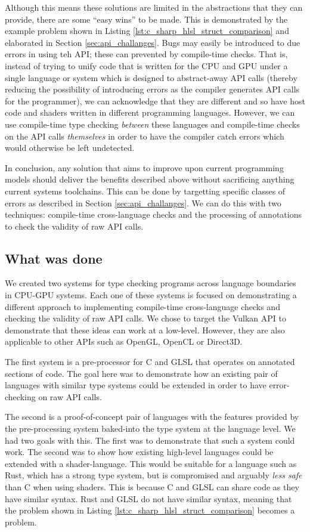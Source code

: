 \documentclass[a4paper,12pt,twoside,openright]{report}
\begin{document}
Although this means these solutions are limited in the abstractions that they
can provide, there are some ``easy wins'' to be made. This is demonstrated by
the example problem shown in Listing \ref{lst:c_sharp_hlsl_struct_comparison}
and elaborated in Section \ref{sec:api_challanges}. Bugs may easily be
introduced to due errors in using teh API; these can prevented by compile-time
checks. That is, instead of trying to unify code that is written for the CPU
and GPU under a single language or system which is designed to abstract-away
API calls (thereby reducing the possibility of introducing errors as the
compiler generates API calls for the programmer), we can acknowledge that they
are different and so have host code and shaders written in different
programming languages. However, we can use compile-time type checking
\textit{between} these languages and compile-time checks on the API calls
\textit{themselves} in order to have the compiler catch errors which would
otherwise be left undetected.

In conclusion, any solution that aims to improve upon current programming
models should deliver the benefits described above without sacrificing anything
current systems toolchains. This can be done by targetting specific classes of
errors as described in Section \ref{sec:api_challanges}. We can do this with
two techniques: compile-time cross-language checks and the processing of
annotations to check the validity of raw API calls.

\subsection{What was done}

We created two systems for type checking programs across language boundaries in
CPU-GPU systems. Each one of these systems is focused on demonstrating a
different approach to implementing compile-time cross-language checks and
checking the validity of raw API calls. We chose to target the Vulkan API to
demonstrate that these ideas can work at a low-level. However, they are also
applicable to other APIs such as OpenGL, OpenCL or Direct3D.

The first system is a pre-processor for C and GLSL that operates on annotated
sections of code. The goal here was to demonstrate how an existing pair of
languages with similar type systems could be extended in order to have
error-checking on raw API calls.

The second is a proof-of-concept pair of languages with the features provided
by the pre-processing system baked-into the type system at the language level.
We had two goals with this. The first was to demonstrate that such a system
could work. The second was to show how existing high-level languages could be
extended with a shader-language. This would be suitable for a language such as
Rust, which has a strong type system, but is compromised and arguably
\textit{less safe} than C when using shaders. This is because C and GLSL can
share code as they have similar syntax. Rust and GLSL do not have similar
syntax, meaning that the problem shown in Listing
\ref{lst:c_sharp_hlsl_struct_comparison} becomes a problem.
\end{document}
